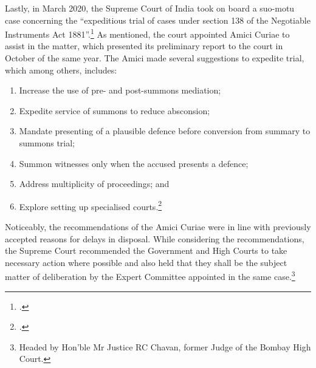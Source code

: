 Lastly, in March 2020, the Supreme Court of India took on board a suo-motu case concerning the “expeditious trial of cases under section 138 of the Negotiable Instruments Act 1881”.\footcite{sc2020_138} As mentioned, the court appointed Amici Curiae to assist in the matter, which presented its preliminary report to the court in October of the same year. The Amici made several suggestions to expedite trial, which among others, includes:

\begin{enumerate}[label=(\alph*)]
 \item Increase the use of pre- and post-summons mediation;
 \item Expedite service of summons to reduce absconsion;
 \item Mandate presenting of a plausible defence before conversion from summary to summons trial;
 \item Summon witnesses only when the accused presents a defence;
 \item Address multiplicity of proceedings; and
 \item Explore setting up specialised courts.\footcite{amicus2020_submission}
\end{enumerate}

Noticeably, the recommendations of the Amici Curiae were in line with previously accepted reasons for delays in disposal. While considering the recommendations, the Supreme Court recommended the Government and High Courts to take necessary action where possible and also held that they shall be the subject matter of deliberation by the Expert Committee appointed in the same case.\footnote{Headed by Hon’ble Mr Justice RC Chavan, former Judge of the Bombay High Court.}

